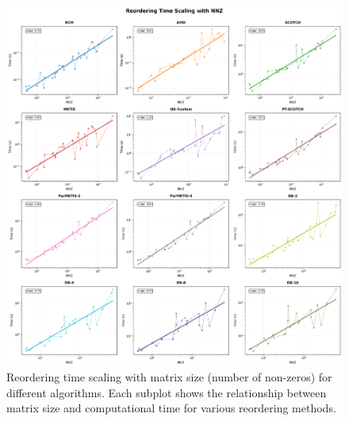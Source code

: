\begin{figure}[h!]
\centering
\includegraphics[width=\textwidth]{fig/res/reorder_time_scaling.png}
\caption{Reordering time scaling with matrix size (number of non-zeros) for different algorithms. Each subplot shows the relationship between matrix size and computational time for various reordering methods.}
\label{fig:reorder-time-scaling}
\end{figure}


